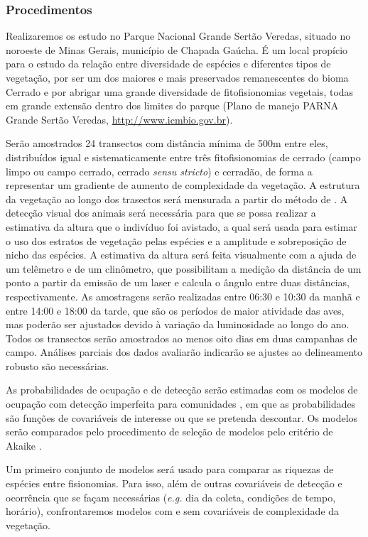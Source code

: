 \documentclass[12pt, A4]{article}
\begin{document}
\subsubsection*{Procedimentos}
\label{sec:aves_proc}

Realizaremos os estudo no Parque Nacional Grande Sertão Veredas,
situado no noroeste de Minas Gerais, município de Chapada
Gaúcha. É um local propício para o estudo da relação entre diversidade
de espécies e diferentes tipos de vegetação, por ser um dos maiores e
mais preservados remanescentes do bioma Cerrado e por abrigar uma
grande diversidade de fitofisionomias vegetais, todas 
em grande extensão dentro dos limites do parque
(Plano de manejo PARNA Grande Sertão Veredas, \url{http://www.icmbio.gov.br}).
 
Serão amostrados 24 transectos com distância mínima de 500m entre eles,
distribuídos igual e sistematicamente entre três fitofisionomias de
cerrado (campo limpo ou campo cerrado, cerrado \emph{sensu stricto}) e
cerradão, de forma
a representar um gradiente de aumento de complexidade da vegetação. A
estrutura da vegetação ao longo dos trasectos será mensurada a partir
do método de \citet{wiens1981}. A detecção visual dos animais
será necessária para que se possa realizar a estimativa da altura que
o indivíduo foi avistado, a qual será usada para estimar o uso dos estratos de
vegetação pelas espécies e a amplitude e sobreposição de nicho das
espécies. A estimativa da altura será feita visualmente com a ajuda de
um telêmetro e de um clinômetro, que possibilitam a medição da
distância de um ponto a partir da emissão de um laser e calcula o
ângulo entre duas distâncias, respectivamente. As amostragens serão
realizadas entre 06:30 e 10:30 da manhã e entre 14:00 e 18:00 da
tarde, que são os períodos de maior atividade das aves, mas poderão
ser ajustados devido à variação da luminosidade ao longo do ano. Todos
os transectos serão amostrados ao menos oito dias em duas campanhas de
campo. Análises parciais dos dados avaliarão indicarão se ajustes ao
delineamento robusto são necessárias. 

As probabilidades de ocupação e de detecção serão estimadas com os
modelos de ocupação com detecção imperfeita para comunidades \citep{mackenzie2003},
em que as probabilidades são funções de covariáveis de interesse ou
que se pretenda descontar. Os modelos serão comparados pelo
procedimento de seleção de modelos pelo critério de Akaike
\citep{Burnham2002}. 

Um primeiro conjunto de modelos será usado para comparar as riquezas
de espécies entre fisionomias. Para isso, além de outras covariáveis
de detecção e ocorrência
que se façam necessárias (\emph{e.g.} dia da coleta, condições de
tempo, horário), confrontaremos modelos com e sem covariáveis de
complexidade da vegetação.
\end{document}

